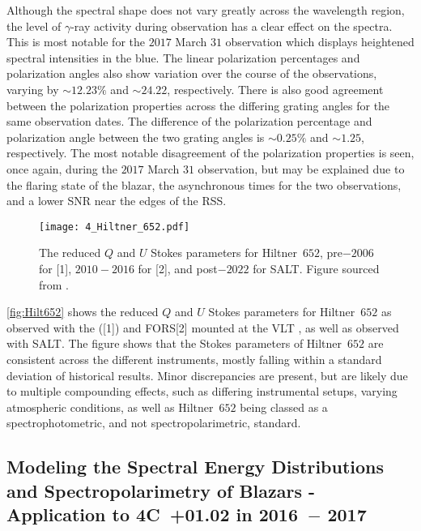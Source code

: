 Although the spectral shape does not vary greatly across the wavelength region, the level of $\gamma$-ray activity during observation has a clear effect on the spectra.
This is most notable for the $2017$ March $31$ observation which displays heightened spectral intensities in the blue.
The linear polarization percentages and polarization angles also show variation over the course of the observations, varying by $\sim 12.23\%$ and $\sim 24.22$\degree, respectively.
There is also good agreement between the polarization properties across the differing grating angles for the same observation dates.
The difference of the polarization percentage and polarization angle between the two grating angles is $\sim 0.25\%$ and $\sim 1.25$\degree, respectively.
The most notable disagreement of the polarization properties is seen, once again, during the $2017$ March $31$ observation, but may be explained due to the flaring state of the blazar, the asynchronous times for the two observations, and a lower \gls{SNR} near the edges of the \gls{RSS}.

\begin{figure}[t]
    \centering
    \texttt{[image: 4\_Hiltner\_652.pdf]}
    \caption{The reduced $Q$ and $U$ Stokes parameters for Hiltner~$652$, pre$-2006$ for [1], $2010 - 2016$ for [2], and post$-2022$ for \gls{SALT}. Figure sourced from \citep{Cooper_HEASA2022}.}
    \label{fig:Hilt652}
\end{figure}

\autoref{fig:Hilt652} shows the reduced $Q$ and $U$ Stokes parameters for Hiltner~$652$ as observed with the  ([1]) and \gls{FORS}[2] mounted at the \gls{VLT} \citep{FORS1, FORS2}, as well as observed with \gls{SALT}.
The figure shows that the Stokes parameters of Hiltner~$652$ are consistent across the different instruments, mostly falling within a standard deviation of historical results.
Minor discrepancies are present, but are likely due to multiple compounding effects, such as differing instrumental setups, varying atmospheric conditions, as well as Hiltner~$652$ being classed as a spectrophotometric, and not spectropolarimetric, standard.

\subsection[Schutte et al.\ (2022)]{%
    Modeling the Spectral Energy Distributions and Spectro\-polari\-metry of Blazars - Application to 4C~+01.02 in 2016~$-$ 2017\\
    \citep{Schutte4C0102}
}

